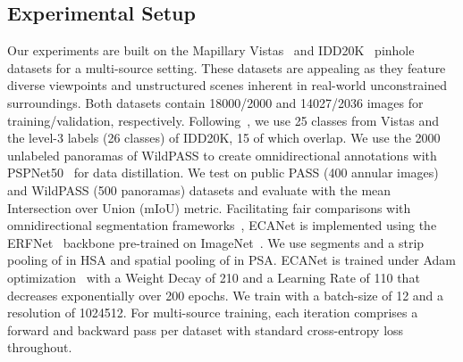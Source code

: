 \documentclass[final]{cvpr}
\begin{document}
\subsection{Experimental Setup}
\label{sec:setup}
Our experiments are built on the Mapillary Vistas~\cite{neuhold2017mapillary} and IDD20K~\cite{varma2019idd} pinhole datasets for a multi-source setting.
These datasets are appealing as they feature diverse viewpoints and unstructured scenes inherent in real-world unconstrained surroundings.
Both datasets contain 18000/2000 and 14027/2036 images for training/validation, respectively. Following~\cite{yang2020omnisupervised}, we use 25 classes from Vistas and the level-3 labels (26 classes) of IDD20K, 15 of which overlap.
We use the 2000 unlabeled panoramas of WildPASS to create omnidirectional annotations with PSPNet50~\cite{zhao2017pyramid} for data distillation.
We test on public PASS (400 annular images) and WildPASS (500 panoramas) datasets and evaluate with the mean Intersection over Union (mIoU) metric.
Facilitating fair comparisons with omnidirectional segmentation frameworks~\cite{yang2020pass,yang2020omnisupervised}, ECANet is implemented using the ERFNet~\cite{romera2018erfnet} backbone pre-trained on ImageNet~\cite{russakovsky2015imagenet}.
We use  segments and a strip pooling of  in HSA and spatial pooling of  in PSA.
ECANet is trained under Adam optimization~\cite{kingma2014adam} with a Weight Decay of 210 and a Learning Rate of 110 that decreases exponentially over 200 epochs. We train with a batch-size of 12 and a resolution of 1024512.
For multi-source training, each iteration comprises a forward and backward pass per dataset with standard cross-entropy loss throughout. 
\end{document}
